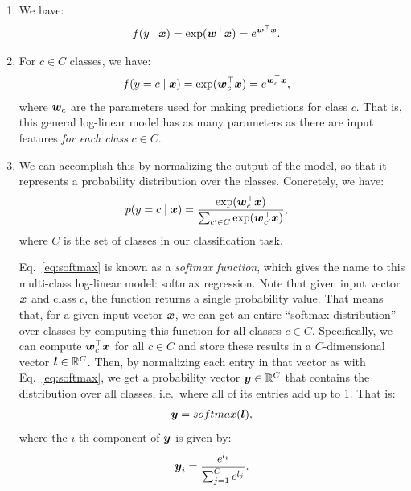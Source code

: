 \documentclass[11pt,a4paper]{article}
\begin{document}
\begin{enumerate}[label=(\alph*)]
          We can still write this in vectorized form, but to do this comfortably
          we make use of what we call a \emph{bias feature} $x_0=1$, which acts
          as the coefficient for the bias weight in the linear combination. That
          is:
          \begin{align}
              p(y=1\mid x) & = \sigma(\vw^\top\vx).
          \end{align}
          where $\vx\in\bb{R}^{n+1}$, i.e.\ $\vx=(x_o, x_1, \ldots, x_n)$.
    \item We have:
          \begin{align}
              f(y\mid{\boldsymbol{x}}) & = \exp({\boldsymbol{w}}^\top{\boldsymbol{x}}) = e^{{\boldsymbol{w}}^\top{\boldsymbol{x}}}.
          \end{align}
    \item For $c\in C$ classes, we have:
          \begin{align}\label{eq:log_linear}
              f(y=c\mid{\boldsymbol{x}}) & = \exp({\boldsymbol{w}}_c^\top{\boldsymbol{x}}) = e^{{\boldsymbol{w}}_c^\top{\boldsymbol{x}}},
          \end{align}
          where ${\boldsymbol{w}}_c$ are the parameters used for making predictions for class
          $c$.
          That is, this general log-linear model has as many parameters as there
          are input features \emph{for each class} $c\in C$.
    \item We can accomplish this by normalizing the output of the model, so that
          it represents a probability distribution over the classes.
          Concretely, we have:
          \begin{align}\label{eq:softmax}
              p(y=c\mid{\boldsymbol{x}}) & = \frac{\exp({\boldsymbol{w}}_c^\top{\boldsymbol{x}})}{\sum_{c'\in C}\exp({\boldsymbol{w}}_{c'}^\top{\boldsymbol{x}})},
          \end{align}
          where $C$ is the set of classes in our classification task.

          Eq.~\ref{eq:softmax} is known as a \emph{softmax function}, which
          gives the name to this multi-class log-linear model: softmax
          regression.
          Note that given input vector ${\boldsymbol{x}}$ and class $c$, the function returns
          a single probability value. That means that, for a given input vector
          ${\boldsymbol{x}}$, we can get an entire ``softmax distribution'' over classes by
          computing this function for all classes $c\in C$.
          Specifically, we can compute ${\boldsymbol{w}}_c^\top{\boldsymbol{x}}$ for all $c\in C$ and 
          store these results in a $C$-dimensional vector ${\boldsymbol{l}}\in\mathbb{R}^C$.
          Then, by normalizing each entry in that vector as with
          Eq.~\ref{eq:softmax}, we get a probability vector ${\boldsymbol{y}}\in\mathbb{R}^C$
          that contains the distribution over all classes, i.e.\ where all of
          its entries add up to 1.
          That is:
          \begin{align}
              {\boldsymbol{y}} = softmax({\boldsymbol{l}}),
          \end{align}
          where the $i$-th component of ${\boldsymbol{y}}$ is given by:
          \begin{align}
              {\boldsymbol{y}}_i = \frac{e^{l_i}}{\sum_{j=1}^{C}e^{l_j}}.
          \end{align}


\end{enumerate}
\end{document}
